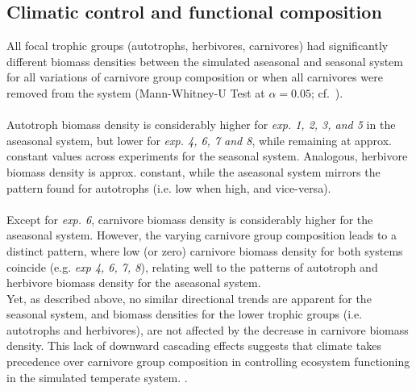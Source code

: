 \subsection{Climatic control and functional composition}
\label{chap:res:diff}
All focal trophic groups (autotrophs, herbivores, carnivores) had significantly different biomass densities between the simulated aseasonal and seasonal system for all variations of carnivore group composition or when all carnivores were removed from the system (Mann-Whitney-U Test at $\alpha = 0.05$; cf.~).\\\\
Autotroph biomass density is considerably higher for \textit{exp. 1, 2, 3, and 5} in the aseasonal system, but lower for \textit{exp. 4, 6, 7 and 8}, while remaining at approx. constant values across experiments for the seasonal system. 
Analogous, herbivore biomass density is approx. constant, while the aseasonal system mirrors the pattern found for autotrophs (i.e. low when high, and vice-versa). \\\\
Except for \textit{exp. 6}, carnivore biomass density is considerably higher for the aseasonal system. 
However, the varying carnivore group composition leads to a distinct pattern, where low (or zero) carnivore biomass density for both systems coincide (e.g. \textit{exp 4, 6, 7, 8}), relating well to the patterns of autotroph and herbivore biomass density for the aseasonal system. \\
Yet, as described above, no similar directional trends are apparent for the seasonal system, and biomass densities for the lower trophic groups (i.e. autotrophs and herbivores), are not affected by the decrease in carnivore biomass density. This lack of downward cascading effects suggests that climate takes precedence  over carnivore group composition in controlling ecosystem functioning in the simulated temperate system. .

